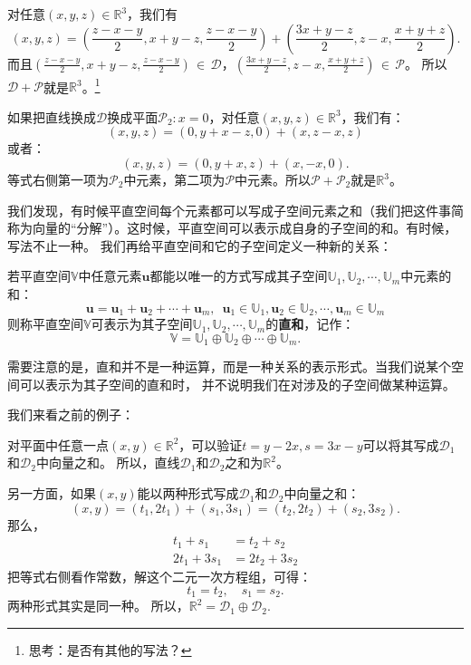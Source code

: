 \documentclass[12pt,UTF8]{ctexbook}
\begin{document}
对任意$(x,y,z) \in \mathbb{R}^3$，我们有
$$(x,y,z) = \left(\frac{z-x-y}{2},x+y-z,\frac{z-x-y}{2}\right) + \left(\frac{3x+y-z}{2},z-x,\frac{x+y+z}{2}\right).$$
而且$(\frac{z-x-y}{2},x+y-z,\frac{z-x-y}{2})\,\in\,\mathcal{D}$，$(\frac{3x+y-z}{2},z-x,\frac{x+y+z}{2})\,\in\,\mathcal{P}$。
所以$\mathcal{D}+\mathcal{P}$就是$\mathbb{R}^3$。\footnote{思考：是否有其他的写法？}

如果把直线换成$\mathcal{D}$换成平面$\mathcal{P}_2 : x = 0$，对任意$(x,y,z) \in \mathbb{R}^3$，我们有：
$$(x,y,z) = \left(0,y+x-z,0\right) + \left(x,z-x,z\right)$$
或者：
$$(x,y,z) = \left(0,y+x,z\right) + \left(x,-x,0\right).$$
等式右侧第一项为$\mathcal{P}_2$中元素，第二项为$\mathcal{P}$中元素。所以$\mathcal{P}+\mathcal{P}_2$就是$\mathbb{R}^3$。

我们发现，有时候平直空间每个元素都可以写成子空间元素之和（我们把这件事简称为向量的“分解”）。这时候，平直空间可以表示成自身的子空间的和。有时候，写法不止一种。
我们再给平直空间和它的子空间定义一种新的关系：

\begin{df}\label{df:1_4}
    若平直空间$\mathbb{V}$中任意元素$\mathbf{u}$都能以唯一的方式写成其子空间$\mathbb{U}_1, \mathbb{U}_2, \cdots , \mathbb{U}_m$中元素的和：
    $$ \mathbf{u} = \mathbf{u}_1+\mathbf{u}_2+\cdots+\mathbf{u}_m ,\,\,\, \mathbf{u}_1 \in \mathbb{U}_1, \mathbf{u}_2 \in \mathbb{U}_2, \cdots , \mathbf{u}_m \in \mathbb{U}_m $$
    则称平直空间$\mathbb{V}$可表示为其子空间$\mathbb{U}_1, \mathbb{U}_2, \cdots , \mathbb{U}_m$的\textbf{直和}，记作：
    $$ \mathbb{V} = \mathbb{U}_1 \oplus \mathbb{U}_2 \oplus \cdots \oplus \mathbb{U}_m.$$
\end{df}

需要注意的是，直和并不是一种运算，而是一种关系的表示形式。当我们说某个空间可以表示为其子空间的直和时，
并不说明我们在对涉及的子空间做某种运算。

我们来看之前的例子：

对平面中任意一点$(x,y)\in\mathbb{R}^2$，可以验证$t = y - 2x, s = 3x - y$可以将其写成$\mathcal{D}_1$和$\mathcal{D}_2$中向量之和。
所以，直线$\mathcal{D}_1$和$\mathcal{D}_2$之和为$\mathbb{R}^2$。

另一方面，如果$(x,y)$能以两种形式写成$\mathcal{D}_1$和$\mathcal{D}_2$中向量之和：
$$ (x, y) = (t_1, 2t_1) + (s_1, 3s_1) = (t_2, 2t_2) + (s_2, 3s_2).$$
那么，
\begin{align*}
    t_1 + s_1 &= t_2 + s_2  \\
    2t_1 + 3s_1 &= 2t_2 + 3s_2 
\end{align*}
把等式右侧看作常数，解这个二元一次方程组，可得：
$$ t_1 = t_2, \quad s_1 = s_2.$$
两种形式其实是同一种。
所以，$\mathbb{R}^2 = \mathcal{D}_1 \oplus \mathcal{D}_2.$
\end{document}
